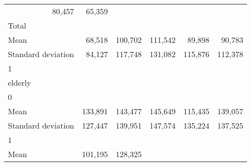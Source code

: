 \begin{tabular}{llllll}
  \multicolumn{1}{r}{80,457} &
  \multicolumn{1}{r}{65,359} \\
\multicolumn{1}{l}{\hspace{3em}Total} &
  \multicolumn{1}{|r}{} &
  \multicolumn{1}{r}{} &
  \multicolumn{1}{r}{} &
  \multicolumn{1}{r}{} &
  \multicolumn{1}{r}{} \\
\multicolumn{1}{l}{\hspace{4em}Mean} &
  \multicolumn{1}{|r}{68,518} &
  \multicolumn{1}{r}{100,702} &
  \multicolumn{1}{r}{111,542} &
  \multicolumn{1}{r}{89,898} &
  \multicolumn{1}{r}{90,783} \\
\multicolumn{1}{l}{\hspace{4em}Standard deviation} &
  \multicolumn{1}{|r}{84,127} &
  \multicolumn{1}{r}{117,748} &
  \multicolumn{1}{r}{131,082} &
  \multicolumn{1}{r}{115,876} &
  \multicolumn{1}{r}{112,378} \\
\multicolumn{1}{l}{\hspace{1em}1} &
  \multicolumn{1}{|r}{} &
  \multicolumn{1}{r}{} &
  \multicolumn{1}{r}{} &
  \multicolumn{1}{r}{} &
  \multicolumn{1}{r}{} \\
\multicolumn{1}{l}{\hspace{2em}elderly} &
  \multicolumn{1}{|r}{} &
  \multicolumn{1}{r}{} &
  \multicolumn{1}{r}{} &
  \multicolumn{1}{r}{} &
  \multicolumn{1}{r}{} \\
\multicolumn{1}{l}{\hspace{3em}0} &
  \multicolumn{1}{|r}{} &
  \multicolumn{1}{r}{} &
  \multicolumn{1}{r}{} &
  \multicolumn{1}{r}{} &
  \multicolumn{1}{r}{} \\
\multicolumn{1}{l}{\hspace{4em}Mean} &
  \multicolumn{1}{|r}{133,891} &
  \multicolumn{1}{r}{143,477} &
  \multicolumn{1}{r}{145,649} &
  \multicolumn{1}{r}{115,435} &
  \multicolumn{1}{r}{139,057} \\
\multicolumn{1}{l}{\hspace{4em}Standard deviation} &
  \multicolumn{1}{|r}{127,447} &
  \multicolumn{1}{r}{139,951} &
  \multicolumn{1}{r}{147,574} &
  \multicolumn{1}{r}{135,224} &
  \multicolumn{1}{r}{137,525} \\
\multicolumn{1}{l}{\hspace{3em}1} &
  \multicolumn{1}{|r}{} &
  \multicolumn{1}{r}{} &
  \multicolumn{1}{r}{} &
  \multicolumn{1}{r}{} &
  \multicolumn{1}{r}{} \\
\multicolumn{1}{l}{\hspace{4em}Mean} &
  \multicolumn{1}{|r}{101,195} &
  \multicolumn{1}{r}{128,325} &

\end{tabular}
